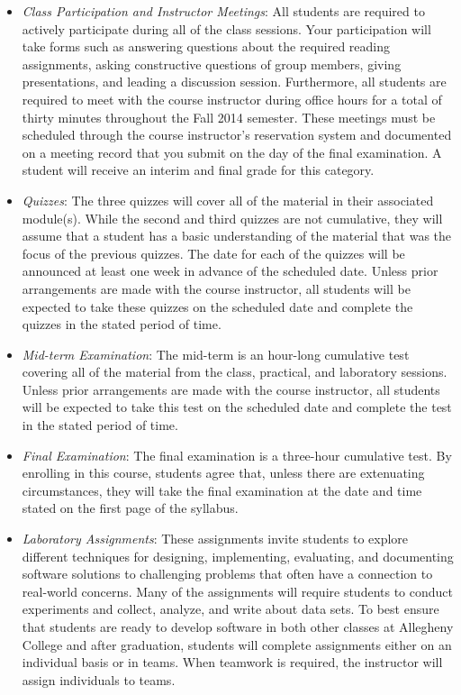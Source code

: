 \begin{itemize}

  \item {\em Class Participation and Instructor Meetings}: All students are required to actively participate
    during all of the class sessions. Your participation will take forms such as answering questions about the
    required reading assignments, asking constructive questions of group members, giving presentations, and
    leading a discussion session. Furthermore, all students are required to meet with the course instructor during
    office hours for a total of thirty minutes throughout the Fall 2014 semester.  These meetings must be scheduled
    through the course instructor's reservation system and documented on a meeting record that you submit on the
    day of the final examination. A student will receive an interim and final grade for this category.

  \item {\em Quizzes}: The three quizzes will cover all of the material in their associated module(s).  While the second
    and third quizzes are not cumulative, they will assume that a student has a basic understanding of the material that
    was the focus of the previous quizzes.  The date for each of the quizzes will be announced at least one week in
    advance of the scheduled date.  Unless prior arrangements are made with the course instructor, all students will be
    expected to take these quizzes on the scheduled date and complete the quizzes in the stated period of time.

  \item {\em Mid-term Examination}: The mid-term is an hour-long cumulative test covering all of the material from the
    class, practical, and laboratory sessions. Unless prior arrangements are made with the course instructor, all
    students will be expected to take this test on the scheduled date and complete the test in the stated period of
    time.

  \item {\em Final Examination}: The final examination is a three-hour cumulative test.  By enrolling in this
    course, students agree that, unless there are extenuating circumstances, they will take the final examination
    at the date and time stated on the first page of the syllabus.

  \item {\em Laboratory Assignments}: These assignments invite students to explore different techniques for
    designing, implementing, evaluating, and documenting software solutions to challenging problems that often
    have a connection to real-world concerns.  Many of the assignments will require students to conduct
    experiments and collect, analyze, and write about data sets.  To best ensure that students are ready to
    develop software in both other classes at Allegheny College and after graduation, students will complete
    assignments either on an individual basis or in teams.  When teamwork is required, the instructor will assign
    individuals to teams.


\end{itemize}

